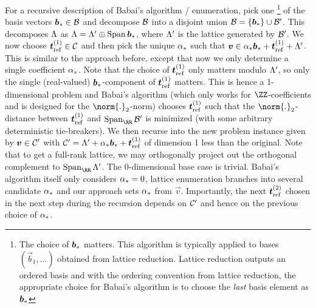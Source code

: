 \begin{remark}
For a recursive description of Babai's algorithm / enumeration, pick one%
\footnote{The choice of $\boldsymbol{b}_{\ast}$ matters. This algorithm is typically applied to bases $(\vec{b}_1,\ldots)$ obtained from lattice reduction. Lattice reduction outputs an ordered basis and with the ordering convention from lattice reduction, the appropriate choice for Babai's algorithm is to choose the \emph{last} basis element as $\boldsymbol{b}_{\ast}$}
of the basis vectors $\boldsymbol{b}_{\ast}\in\mathcal{B}$ and decompose $\mathcal{B}$ into a disjoint union
$\mathcal{B} = \{\boldsymbol{b}_{\ast}\}\cup \mathcal{B}'$. This decomposes $\Lambda$ as $\Lambda = \Lambda'\oplus \operatorname*{Span}\boldsymbol{b}_{\ast}$, where $\Lambda'$ is the lattice generated by $\mathcal{B}'$. We now choose $\boldsymbol{t}_{\mathrm{ref}}^{(1)}\in\mathcal{C}$ and then pick the unique $\alpha_{\ast}$ such that $\boldsymbol{v} \in \alpha_{\ast}\boldsymbol{b}_{\ast} + \boldsymbol{t}_{\mathrm{ref}}^{(1)} + \Lambda'$. This is similar to the approach before, except that now we only determine a single coefficient $\alpha_{\ast}$. Note that the choice of $\boldsymbol{t}_{\mathrm{ref}}^{(1)}$ only matters modulo $\Lambda'$, so only the single (real-valued) $\boldsymbol{b}_{\ast}$-component of $\boldsymbol{t}_{\mathrm{ref}}^{(1)}$ matters. This is hence a 1-dimensional problem and Babai's algorithm (which only works for $\ZZ$-coefficients and is designed for the $\norm{.}_2$-norm) chooses $\boldsymbol{t}_{\mathrm{ref}}^{(1)}$ such that the $\norm{.}_2$-distance between $\boldsymbol{t}_{\mathrm{ref}}^{(1)}$ and $\Span_{\RR}\kernelbasis'$ is minimized (with some arbitrary deterministic tie-breakers).
We then recurse into the new problem instance given by $\boldsymbol{v} \in \mathcal{C}'$ with $\mathcal{C}' = \Lambda' + \alpha_{\ast}\boldsymbol{b}_{\ast} + \boldsymbol{t}_{\mathrm{ref}}^{(1)}$ of dimension 1 less than the original. Note that to get a full-rank lattice, we may orthogonally project out the orthogonal complement to $\Span_\RR\latgeneral'$. The 0-dimensional base case is trivial. Babai's algorithm itself only considers $\alpha_{\ast} = 0$, lattice enumeration branches into several candidate $\alpha_{\ast}$ and our approach sets $\alpha_{\ast}$ from $\vec{v}$. Importantly, the next $\boldsymbol{t}_{\mathrm{ref}}^{(2)}$ chosen in the next step during the recursion depends on $\mathcal{C}'$ and hence on the previous choice of $\alpha_{\ast}$.


\end{remark}
